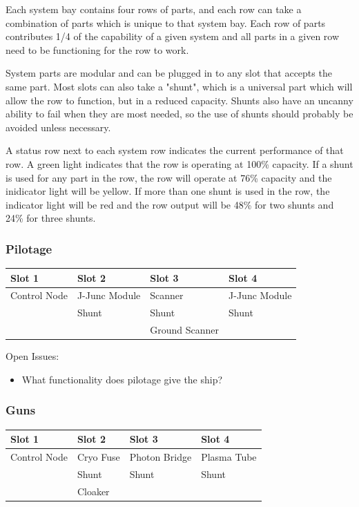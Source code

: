 Each system bay contains four rows of parts, and each row can take a
combination of parts which is unique to that system bay.  Each row of
parts contributes 1/4 of the capability of a given system and all parts
in a given row need to be functioning for the row to work.

System parts are modular and can be plugged in to any slot that accepts the
same part.  Most slots can also take a "shunt", which is a universal part
which will allow the row to function, but in a reduced capacity.  Shunts
also have an uncanny ability to fail when they are most needed, so the use
of shunts should probably be avoided unless necessary.

A status row next to each system row indicates the current performance
of that row.  A green light indicates that the row is operating at
100\% capacity.  If a shunt is used for any part in the row, the row will
operate at 76\% capacity and the inidicator light will be yellow.  If
more than one shunt is used in the row, the indicator light will be red
and the row output will be 48\% for two shunts and 24\% for three shunts.

\subsubsection{Pilotage}

\begin{tabular}{ | p{2.5cm} | p{2.5cm} | p{2.5cm} | p{2.5cm} | }
\hline
Slot 1 & Slot 2 & Slot 3 & Slot 4 \\ \hline
Control Node & J-Junc Module & Scanner & J-Junc Module \\
& Shunt & Shunt & Shunt \\
& & Ground Scanner & \\
\hline
\end{tabular}

Open Issues:
\begin{itemize}
\item What functionality does pilotage give the ship?
\end{itemize}

\subsubsection{Guns}

\begin{tabular}{ | p{2.5cm} | p{2.5cm} | p{2.5cm} | p{2.5cm} | }
\hline
Slot 1 & Slot 2 & Slot 3 & Slot 4 \\ \hline
Control Node & Cryo Fuse & Photon Bridge & Plasma Tube \\
& Shunt & Shunt & Shunt \\
& Cloaker & & \\
\hline
\end{tabular}

